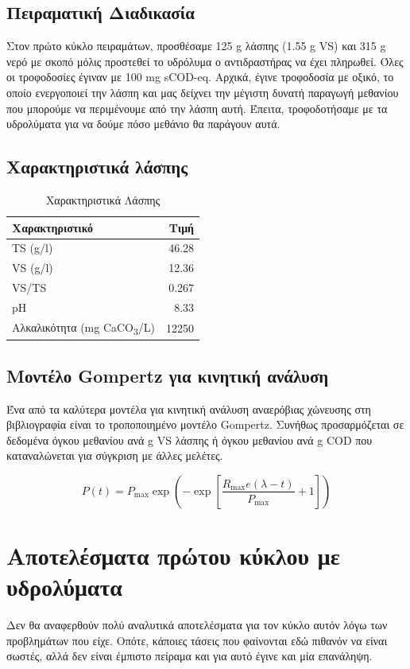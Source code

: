 \documentclass[11pt]{article}
\begin{document}
\subsection{Πειραματική Διαδικασία}
\label{sec:org85c27fc}
Στον πρώτο κύκλο πειραμάτων, προσθέσαμε 125 g λάσπης (1.55 g VS) και 315 g νερό με σκοπό μόλις προστεθεί το υδρόλυμα ο αντιδραστήρας να έχει πληρωθεί. Όλες οι τροφοδοσίες έγιναν με 100 mg sCOD-eq. Αρχικά, έγινε τροφοδοσία με οξικό, το οποίο ενεργοποιεί την λάσπη και μας δείχνει την μέγιστη δυνατή παραγωγή μεθανίου που μπορούμε να περιμένουμε από την λάσπη αυτή. Έπειτα, τροφοδοτήσαμε με τα υδρολύματα για να δούμε πόσο μεθάνιο θα παράγουν αυτά.

\subsection{Χαρακτηριστικά λάσπης}
\label{sec:org7ad0055}
\begin{table}[htbp]
\caption{Χαρακτηριστικά Λάσπης}
\centering
\begin{tabular}{lr}
Χαρακτηριστικό & Τιμή\\[0pt]
\hline
TS (g/l) & 46.28\\[0pt]
VS (g/l) & 12.36\\[0pt]
VS/TS & 0.267\\[0pt]
pH & 8.33\\[0pt]
Αλκαλικότητα (mg CaCO\textsubscript{3}/L) & 12250\\[0pt]
\end{tabular}
\end{table}

\subsection{Μοντέλο Gompertz για κινητική ανάλυση}
\label{sec:org06fdcd1}
Ένα από τα καλύτερα μοντέλα για κινητική ανάλυση αναερόβιας χώνευσης στη βιβλιογραφία είναι το τροποποιημένο μοντέλο Gompertz. Συνήθως προσαρμόζεται σε δεδομένα όγκου μεθανίου ανά g VS λάσπης ή όγκου μεθανίου ανά g COD που καταναλώνεται για σύγκριση με άλλες μελέτες.

\[ P(t) = P_{\max } \exp \left( - \exp \left[ \frac{R_{\max }e (λ-t)}{P_{\max }} + 1 \right] \right) \]

\section{Αποτελέσματα πρώτου κύκλου με υδρολύματα}
\label{sec:org11c1de9}
Δεν θα αναφερθούν πολύ αναλυτικά αποτελέσματα για τον κύκλο αυτόν λόγω των προβλημάτων που είχε. Οπότε, κάποιες τάσεις που φαίνονται εδώ πιθανόν να είναι σωστές, αλλά δεν είναι έμπιστο πείραμα και για αυτό έγινε και μία επανάληψη.
\end{document}
